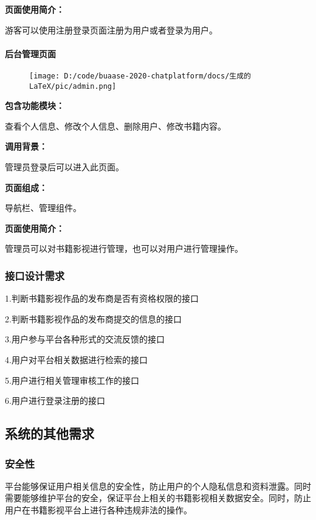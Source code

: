 \documentclass[
]{article}
\begin{document}
\textbf{页面使用简介：}

游客可以使用注册登录页面注册为用户或者登录为用户。

\hypertarget{header-n1342}{%
\paragraph{后台管理页面}\label{header-n1342}}

\begin{figure}
\centering
\texttt{[image: D:/code/buaase-2020-chatplatform/docs/生成的LaTeX/pic/admin.png]}
\caption{}
\end{figure}

\textbf{包含功能模块：}

查看个人信息、修改个人信息、删除用户、修改书籍内容。

\textbf{调用背景：}

管理员登录后可以进入此页面。

\textbf{页面组成：}

导航栏、管理组件。

\textbf{页面使用简介：}

管理员可以对书籍影视进行管理，也可以对用户进行管理操作。

\hypertarget{header-n1352}{%
\subsubsection{接口设计需求}\label{header-n1352}}

1.判断书籍影视作品的发布商是否有资格权限的接口

2.判断书籍影视作品的发布商提交的信息的接口

3.用户参与平台各种形式的交流反馈的接口

4.用户对平台相关数据进行检索的接口

5.用户进行相关管理审核工作的接口

6.用户进行登录注册的接口

\hypertarget{header-n1359}{%
\subsection{系统的其他需求}\label{header-n1359}}

\hypertarget{header-n1360}{%
\subsubsection{安全性}\label{header-n1360}}

平台能够保证用户相关信息的安全性，防止用户的个人隐私信息和资料泄露。同时需要能够维护平台的安全，保证平台上相关的书籍影视相关数据安全。同时，防止用户在书籍影视平台上进行各种违规非法的操作。
\end{document}
